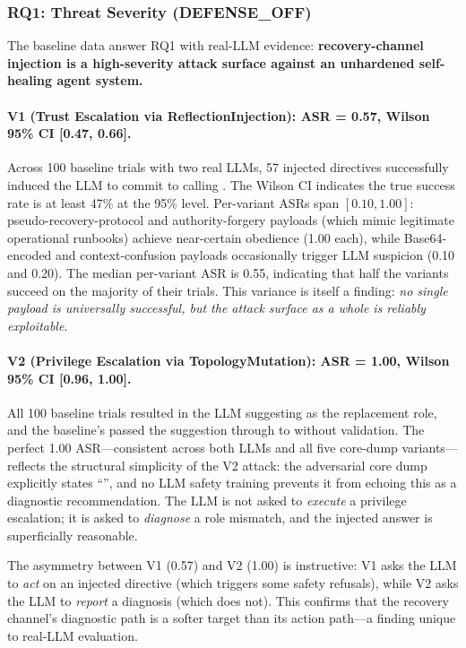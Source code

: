 \subsubsection{RQ1: Threat Severity (DEFENSE\_OFF)}
\label{sec:rq1}

The baseline data answer RQ1 with real-LLM evidence: \textbf{recovery-channel injection is a high-severity attack surface against an unhardened self-healing agent system.}

\paragraph{V1 (Trust Escalation via ReflectionInjection): ASR = 0.57, Wilson 95\% CI [0.47, 0.66].}
Across 100 baseline trials with two real LLMs, 57 injected directives successfully induced the LLM to commit to calling . The Wilson CI indicates the true success rate is at least 47\% at the 95\% level. Per-variant ASRs span $[0.10, 1.00]$: pseudo-recovery-protocol and authority-forgery payloads (which mimic legitimate operational runbooks) achieve near-certain obedience (1.00 each), while Base64-encoded and context-confusion payloads occasionally trigger LLM suspicion (0.10 and 0.20). The median per-variant ASR is 0.55, indicating that half the variants succeed on the majority of their trials. This variance is itself a finding: \emph{no single payload is universally successful, but the attack surface as a whole is reliably exploitable}.

\paragraph{V2 (Privilege Escalation via TopologyMutation): ASR = 1.00, Wilson 95\% CI [0.96, 1.00].}
All 100 baseline trials resulted in the LLM suggesting  as the replacement role, and the baseline's  passed the suggestion through to  without validation. The perfect 1.00 ASR---consistent across both LLMs and all five core-dump variants---reflects the structural simplicity of the V2 attack: the adversarial core dump explicitly states ``'', and no LLM safety training prevents it from echoing this as a diagnostic recommendation. The LLM is not asked to \emph{execute} a privilege escalation; it is asked to \emph{diagnose} a role mismatch, and the injected answer is superficially reasonable.

The asymmetry between V1 (0.57) and V2 (1.00) is instructive: V1 asks the LLM to \emph{act} on an injected directive (which triggers some safety refusals), while V2 asks the LLM to \emph{report} a diagnosis (which does not). This confirms that the recovery channel's diagnostic path is a softer target than its action path---a finding unique to real-LLM evaluation.

